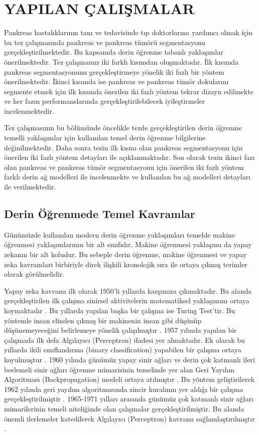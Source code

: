 \chapter{YAPILAN ÇALIŞMALAR \label{sec:yapilancalismalar}}

Pankreas hastalıklarının tanı ve tedavisinde tıp doktorlarına yardımcı olmak için bu tez çalışmasında pankreas ve pankreas tümörü segmentasyonu gerçekleştirilmektedir. Bu kapsamda derin öğrenme tabanlı yaklaşımlar önerilmektedir. Tez çalışmamız iki farklı kısımdan oluşmaktadır. İlk kısımda pankreas segmentasyonunu gerçekleştirmeye yönelik iki fazlı bir yöntem önerilmektedir. İkinci kısımda ise pankreas ve pankreas tümör dokularını segmente etmek için ilk kısımda önerilen iki fazlı yöntem tekrar dizayn edilmekte ve her fazın performanslarında gerçekleştirilebilecek iyileştirmeler incelenmektedir. 

Tez çalışmasının bu bölümünde öncelikle tezde gerçekleştirilen derin öğrenme temelli yaklaşımlar için kullanılan temel derin öğrenme bilgilerine değinilmektedir. Daha sonra tezin ilk kısmı olan pankreas segmentasyonu için önerilen iki fazlı yöntem detayları ile açıklanmaktadır. Son olarak tezin ikinci fazı olan pankreas ve pankreas tümör segmentasyonu için önerilen iki fazlı yöntem farklı derin ağ modelleri ile incelenmekte ve kullanılan bu ağ modelleri detayları ile verilmektedir.

\section{Derin Öğrenmede Temel Kavramlar}
Günümüzde kullanılan modern derin öğrenme yaklaşımları temelde makine öğrenmesi yaklaşımlarının bir alt sınıfıdır. Makine öğrenmesi yaklaşımı da yapay zekanın bir alt koludur. Bu sebeple derin öğrenme, makine öğrenmesi ve yapay zeka kavramları birbiriyle direk ilişkili kronolojik sıra ile ortaya çıkmış terimler olarak görülmelidir.

Yapay zeka kavramı ilk olarak 1950'li yıllarda karşımıza çıkmaktadır. Bu alanda gerçekleştirilen ilk çalışma sinirsel aktivitelerin matematiksel yaklaşımını ortaya koymaktadır \cite{mcculloch1943logical}. Bu yıllarda yapılan başka bir çalışma ise Turing Test'tir. Bu yöntemle insan elinden çıkmış bir makinenin insan gibi düşünüp düşünemeyeceğini belirlemeye yönelik çalışılmıştır \cite{turing2009computing}. 1957 yılında yapılan bir çalışmada ilk defa Algılayıcı (Perceptron) ifadesi yer almaktadır. Ek olarak bu yıllarda ikili sınıflandırma (binary classification) yapabilen bir çalışma ortaya koyulmuştur \cite{rosenblatt1957perceptron}. 1960 yılında günümüz yapay sinir ağları ve derin çok katmanlı ileri beslemeli sinir ağları öğrenme mimarisinin temelinde yer alan Geri Yayılım Algoritması (Backpropagation) modeli ortaya atılmıştır \cite{kelley1960gradient}. Bu yöntem geliştirilerek 1962 yılında geri yayılım algoritmasında zincir kuralının yer aldığı bir çalışma gerçekleştirilmiştir \cite{dreyfus1962numerical}. 1965-1971 yılları arasında günümüz çok katmanlı sinir ağları mimarilerinin temeli niteliğinde olan çalışmalar gerçekleştirilmiştir. Bu alanda önemli ilerlemeler katedilerek Algılayıcı (Perceptron) kavramı sağlamlaştırılmıştır  \cite{ivakhnenko1971polynomial,minsky2017perceptrons}.

